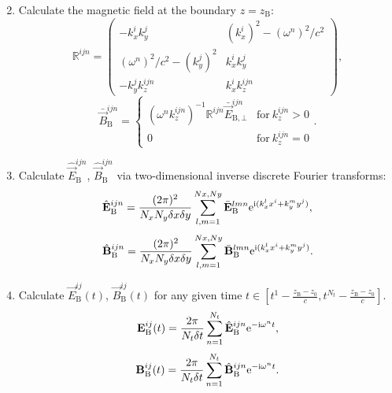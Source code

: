 \begin{enumerate}
\begin{equation}
	\end{equation}
	\item Calculate the magnetic field at the boundary $ z = z_\mathrm{B} $:
	\begingroup
	\renewcommand*{\arraystretch}{1.7}
	\begin{equation}
	\mathbb{R}^{ijn} =  \begin{pmatrix}
	-k_x^i k_y^j & (k_x^i)^2 - (\omega^n)^2/c^2 \\
	(\omega^n)^2/c^2 - (k_y^j)^2 & k_x^i k_y^j \\
	-k_y^j k_z^{ijn} & k_x^i k_z^{ijn} 
	\end{pmatrix},
	\end{equation} 
	\endgroup
	\begin{equation}
	\bar{\vec{B}}_{\mathrm{B}}^{ijn} = \begin{cases} (\omega^n k_z^{ijn})^{-1} \mathbb{R}^{ijn} \bar{\vec{E}}_{\mathrm{B}, \bot}^{ijn} & \text{for} \ k_z^{ijn} > 0 \\ 0 & \text{for} \ k_z^{ijn} = 0 \end{cases}.
	\end{equation}
	\item Calculate $ \hat{\vec{E}}_{\mathrm{B}}^{ijn} $, $ \hat{\vec{B}}_{\mathrm{B}}^{ijn} $ via two-dimensional inverse discrete Fourier transforms:
	\begin{equation}
	\hat{\mathbf{E}}_{\mathrm{B}}^{ijn} = \frac{(2 \pi)^2}{N_x N_y \delta x \delta y} \sum_{l, m = 1}^{Nx, Ny} \bar{\mathbf{E}}_{\mathrm{B}}^{lmn} \mathrm{e}^{\mathrm{i}(k_x^l x^i + k_y^m y^j)},
	\end{equation}
	\begin{equation}
	\hat{\mathbf{B}}_{\mathrm{B}}^{ijn} = \frac{(2 \pi)^2}{N_x N_y \delta x \delta y}  \sum_{l, m = 1}^{Nx, Ny} \bar{\mathbf{B}}_{\mathrm{B}}^{lmn} \mathrm{e}^{\mathrm{i}(k_x^l x^i + k_y^m y^j)}.
	\end{equation}
	\item Calculate $ \vec{E}_{\mathrm{B}}^{ij}(t) $, $ \vec{B}_{\mathrm{B}}^{ij}(t) $ for any given time $ t \in [t^{1} - \frac{z_{\mathrm{B}} - z_{0}}{c}, t^{N_{t}}  - \frac{z_{\mathrm{B}} - z_{0}}{c}] $.
	\begin{equation}
	\mathbf{E}_{\mathrm{B}}^{ij} (t) = \frac{2 \pi}{N_t \delta t} \sum_{n = 1}^{N_t} \hat{\mathbf{E}}_{\mathrm{B}}^{ijn} \mathrm{e}^{-\mathrm{i} \omega^n t},
	\end{equation}
	\begin{equation}
	\mathbf{B}_{\mathrm{B}}^{ij} (t) = \frac{2 \pi}{N_t \delta t} \sum_{n = 1}^{N_t} \hat{\mathbf{B}}_{\mathrm{B}}^{ijn} \mathrm{e}^{-\mathrm{i} \omega^n t}.
	\end{equation}
\end{enumerate}


